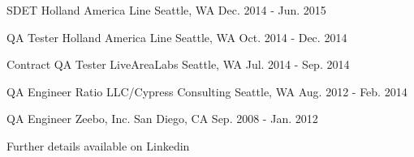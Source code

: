 \begin{cventries}
\cventry
{SDET} %
{Holland America Line} %
{Seattle, WA} %
{Dec. 2014 - Jun. 2015} %
{}

\cventry
{QA Tester} %
{Holland America Line} %
{Seattle, WA} %
{Oct. 2014 - Dec. 2014} %
{}

\cventry
{Contract QA Tester} %
{LiveAreaLabs} %
{Seattle, WA} %
{Jul. 2014 - Sep. 2014} %
{}

\cventry
{QA Engineer} %
{Ratio LLC/Cypress Consulting} %
{Seattle, WA} %
{Aug. 2012 - Feb. 2014} %
{}

\cventry
{QA Engineer} %
{Zeebo, Inc.} %
{San Diego, CA} %
{Sep. 2008 - Jan. 2012} %
{}

\cventry
{} %
{Further details available on Linkedin} %
{} %
{} %
{}

\end{cventries}
